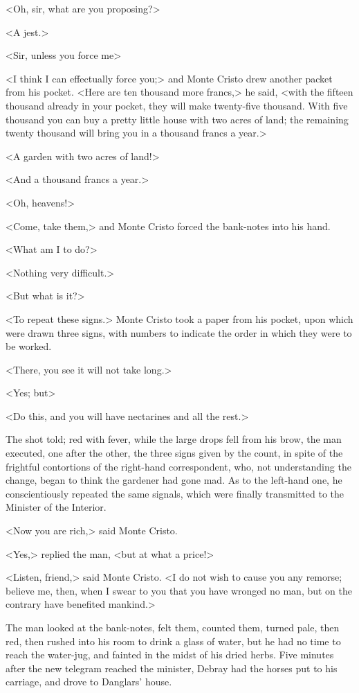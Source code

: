  <Oh, sir, what are you proposing?> 

 <A jest.> 

 <Sir, unless you force me\longdash> 

 <I think I can effectually force you;> and Monte Cristo drew another packet from his pocket. <Here are ten thousand more francs,> he said, <with the fifteen thousand already in your pocket, they will make twenty-five thousand. With five thousand you can buy a pretty little house with two acres of land; the remaining twenty thousand will bring you in a thousand francs a year.> 

 <A garden with two acres of land!> 

 <And a thousand francs a year.> 

 <Oh, heavens!> 

 <Come, take them,> and Monte Cristo forced the bank-notes into his hand. 

 <What am I to do?> 

 <Nothing very difficult.> 

 <But what is it?> 

 <To repeat these signs.> Monte Cristo took a paper from his pocket, upon which were drawn three signs, with numbers to indicate the order in which they were to be worked. 

 <There, you see it will not take long.> 

 <Yes; but\longdash> 

 <Do this, and you will have nectarines and all the rest.> 

 The shot told; red with fever, while the large drops fell from his brow, the man executed, one after the other, the three signs given by the count, in spite of the frightful contortions of the right-hand correspondent, who, not understanding the change, began to think the gardener had gone mad. As to the left-hand one, he conscientiously repeated the same signals, which were finally transmitted to the Minister of the Interior. 

 <Now you are rich,> said Monte Cristo. 

 <Yes,> replied the man, <but at what a price!> 

 <Listen, friend,> said Monte Cristo. <I do not wish to cause you any remorse; believe me, then, when I swear to you that you have wronged no man, but on the contrary have benefited mankind.> 

 The man looked at the bank-notes, felt them, counted them, turned pale, then red, then rushed into his room to drink a glass of water, but he had no time to reach the water-jug, and fainted in the midst of his dried herbs. Five minutes after the new telegram reached the minister, Debray had the horses put to his carriage, and drove to Danglars' house. 

